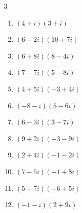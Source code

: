 \begin{multicols}{3}
\begin{enumerate}
        \phantom{$\displaystyle =48+123i$}

  \item $\displaystyle (4+i)(3+i)$

        \phantom{$\displaystyle =11+7i$}

  \item $\displaystyle (6-2i)(10+7i)$

        \phantom{$\displaystyle =74+22i$}

  \item $\displaystyle (6+8i)(8-4i)$

        \phantom{$\displaystyle =80+40i$}

  \item $\displaystyle (7-7i)(5-8i)$

        \phantom{$\displaystyle =-21-91i$}

  \item $\displaystyle (4+5i)(-3+4i)$

        \phantom{$\displaystyle =-32+i$}

  \item $\displaystyle (-8-i)(5-6i)$

        \phantom{$\displaystyle =-46+43i$}

  \item $\displaystyle (6-3i)(3-7i)$

        \phantom{$\displaystyle =-3-51i$}

  \item $\displaystyle (9+2i)(-3-9i)$

        \phantom{$\displaystyle =-9-87i$}

\columnbreak %

\resetques

  \item $\displaystyle (2+4i)(-1-2i)$

        \phantom{$\displaystyle =6-8i$}

  \item $\displaystyle (7-5i)(-1+8i)$

        \phantom{$\displaystyle =33+61i$}

  \item $\displaystyle (5-7i)(-6+5i)$

        \phantom{$\displaystyle =5+67i$}

  \item $\displaystyle (-1-i)(2+9i)$

        \phantom{$\displaystyle =7-11i$}


\end{enumerate}
\end{multicols}
